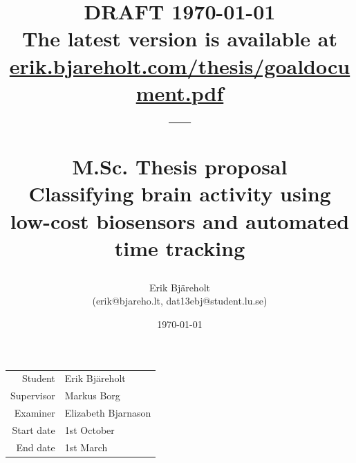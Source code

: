 \documentclass{IEEEtran}
\title{%
    \small DRAFT \today \\
    \small The latest version is available at \href{https://erik.bjareholt.com/thesis/goaldocument.pdf}{erik.bjareholt.com/thesis/goaldocument.pdf}\\
    \large --- \\
    \large \par M.Sc. Thesis proposal\\
    \huge Classifying brain activity using low-cost biosensors and automated time tracking \\
}
\author{Erik Bjäreholt \\(erik@bjareho.lt, dat13ebj@student.lu.se)}
\date{\today}
\begin{document}
\maketitle

\begin{center}
\begin{tabular}{r l}
 Student & Erik Bjäreholt \\
 Supervisor & Markus Borg \\
 Examiner & Elizabeth Bjarnason \\
 Start date & 1st October \\
 End date & 1st March \\
\end{tabular}
\end{center}

\setlength{\parskip}{0em}
\tableofcontents
\setlength{\parskip}{1em}

\end{document}
